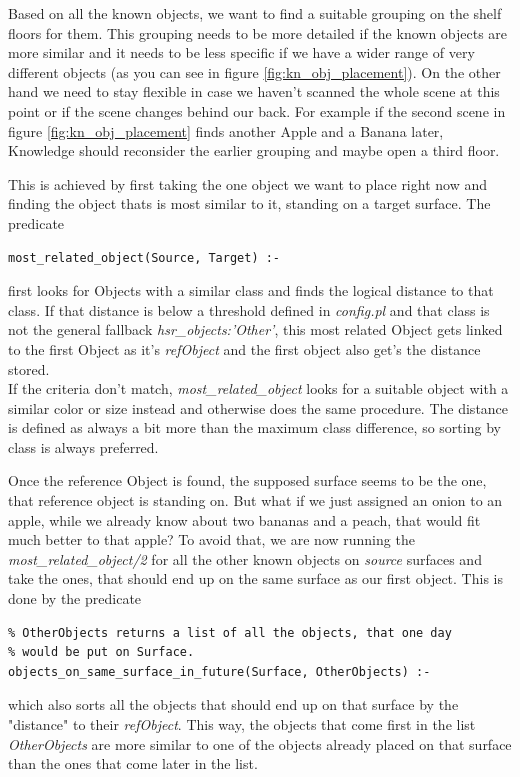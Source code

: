 \documentclass[main.tex]{subfiles}
\begin{document}
Based on all the known objects, we want to find a suitable grouping on the shelf floors for them. This grouping needs to be more detailed if the known objects are more similar and it needs to be less specific if we have a wider range of very different objects (as you can see in figure \ref{fig:kn_obj_placement}). On the other hand we need to stay flexible in case we haven't scanned the whole scene at this point or if the scene changes behind our back. For example if the second scene in figure \ref{fig:kn_obj_placement} finds another Apple and a Banana later, Knowledge should reconsider the earlier grouping and maybe open a third floor.

This is achieved by first taking the one object we want to place right now and finding the object thats is most similar to it, standing on a target surface. The predicate
\begin{lstlisting}
most_related_object(Source, Target) :-
\end{lstlisting}
first looks for Objects with a similar class and finds the logical distance to that class. If that distance is below a threshold defined in \textit{config.pl} and that class is not the general fallback \textit{hsr\_objects:'Other'}, this most related Object gets linked to the first Object as it's \textit{refObject} and the first object also get's the distance stored.\\
If the criteria don't match, \textit{most\_related\_object} looks for a suitable object with a similar color or size instead and otherwise does the same procedure. The distance is defined as always a bit more than the maximum class difference, so sorting by class is always preferred.

Once the reference Object is found, the supposed surface seems to be the one, that reference object is standing on. But what if we just assigned an onion to an apple, while we already know about two bananas and a peach, that would fit much better to that apple? To avoid that, we are now running the \textit{most\_related\_object/2} for all the other known objects on \textit{source} surfaces and take the ones, that should end up on the same surface as our first object. This is done by the predicate
\begin{lstlisting}
% OtherObjects returns a list of all the objects, that one day 
% would be put on Surface.
objects_on_same_surface_in_future(Surface, OtherObjects) :-
\end{lstlisting}
which also sorts all the objects that should end up on that surface by the "distance" to their \textit{refObject}. This way, the objects that come first in the list \textit{OtherObjects} are more similar to one of the objects already placed on that surface than the ones that come later in the list.
\end{document}
